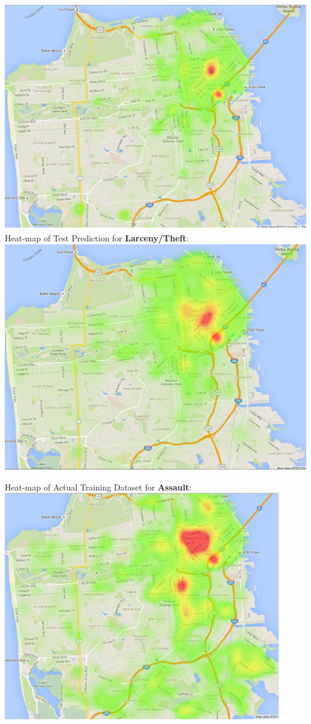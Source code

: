 \documentclass[12pt]{article}
\newenvironment{p4}[2][Part V Results and Evaluation]{\begin{trivlist}
\item[\hskip \labelsep {\bfseries #1}\hskip \labelsep {\bfseries #2}]}{\end{trivlist}}
\begin{document}
\begin{p4}{}
\begin{center}
\includegraphics[height=10cm]{LARCENY_THEFT_train.png}
\\
Heat-map of Test Prediction for \textbf{Larceny/Theft}:\\
\includegraphics[height=10cm]{LARCENY_THEFT_test.png}
\end{center}
\newpage
\begin{center}
Heat-map of Actual Training Dataset for \textbf{Assault}:\\
\includegraphics[height=10cm]{ASSAULT_train.png}

\end{center}
\end{p4}
\end{document}
